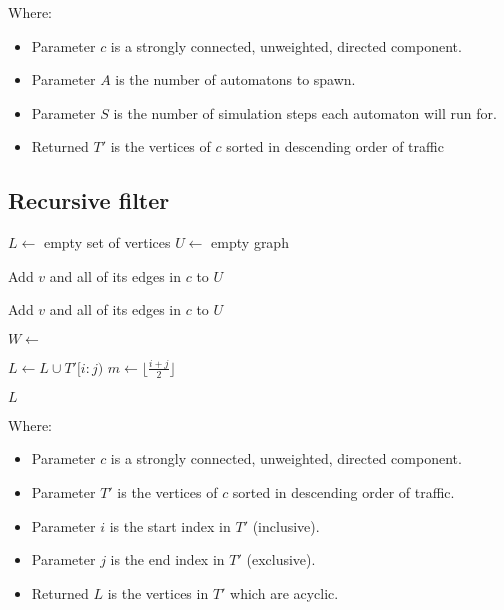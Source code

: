 \documentclass{article}
\begin{document}
\FloatBarrier

\noindent Where:
\begin{itemize}
  \item[] Parameter $c$ is a strongly connected, unweighted, directed component.
  \item[] Parameter $A$ is the number of automatons to spawn.
  \item[] Parameter $S$ is the number of simulation steps each automaton will run for.
  \item[] Returned $T'$ is the vertices of $c$ sorted in descending order of traffic
\end{itemize}

\subsection*{Recursive filter}

\label{alg:recursive-filter}
\begin{algorithmic}[1]
  \State $L \gets$ empty set of vertices
  \State $U \gets$ empty graph

  \State Add $v$ and all of its edges in $c$ to $U$
  \EndFor

  \For{vertex $v \in T'[i:j)$} 
  \State Add $v$ and all of its edges in $c$ to $U$
  \EndFor

  \State $W \gets$ 

  \State $L \gets L \cup T'[i:j)$ 
  \Else
  \State $m \gets \lfloor \frac{i + j}{2} \rfloor$

  \State {}

  \State {}
  \EndIf
  \EndFunction

  \State {}

  \State \Return $L$
  \EndFunction
\end{algorithmic}

\FloatBarrier

\noindent Where:
\begin{itemize}
  \item[] Parameter $c$ is a strongly connected, unweighted, directed component.
  \item[] Parameter $T'$ is the vertices of $c$ sorted in descending order of traffic.
  \item[] Parameter $i$ is the start index in $T'$ (inclusive).
  \item[] Parameter $j$ is the end index in $T'$ (exclusive).
  \item[] Returned $L$ is the vertices in $T'$ which are acyclic.
\end{itemize}
\end{document}
